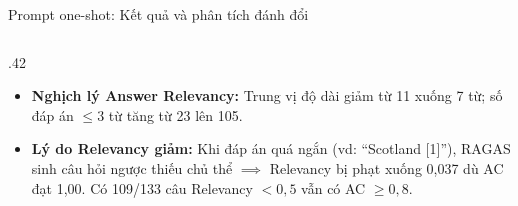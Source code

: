 \begin{frame}[t]{Prompt one-shot: Kết quả và phân tích đánh đổi}
\begin{columns}[T,onlytextwidth]
\begin{column}{.42\textwidth}
{\begin{itemize}
  \item \textbf{Nghịch lý Answer Relevancy:} Trung vị độ dài giảm từ 11 xuống 7 từ; số đáp án $\le 3$ từ tăng từ 23 lên 105.
  \item \textbf{Lý do Relevancy giảm:} Khi đáp án quá ngắn (vd: ``Scotland [1]''), RAGAS sinh câu hỏi ngược thiếu chủ thể $\implies$ Relevancy bị phạt xuống 0,037 dù AC đạt 1,00. Có 109/133 câu Relevancy $<0{,}5$ vẫn có AC $\ge 0{,}8$.
\end{itemize}\par}
\end{column}
\end{columns}
\vspace{1.5mm}
\end{frame}
